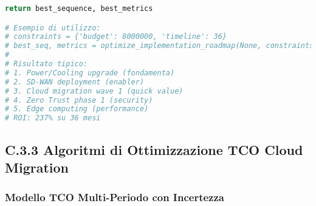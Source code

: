 \begin{lstlisting}[language=Python, caption=Algoritmo di Ottimizzazione Roadmap con Vincoli]
    return best_sequence, best_metrics

# Esempio di utilizzo:
# constraints = {'budget': 8000000, 'timeline': 36}
# best_seq, metrics = optimize_implementation_roadmap(None, constraints)
# 
# Risultato tipico:
# 1. Power/Cooling upgrade (fondamenta)
# 2. SD-WAN deployment (enabler)
# 3. Cloud migration wave 1 (quick value)
# 4. Zero Trust phase 1 (security)
# 5. Edge computing (performance)
# ROI: 237% su 36 mesi
\end{lstlisting}

\subsection{\texorpdfstring{\textbf{C.3.3 Algoritmi di Ottimizzazione TCO Cloud Migration}}{C.3.3 - Algoritmi di Ottimizzazione TCO Cloud Migration}}

\subsubsection{Modello TCO Multi-Periodo con Incertezza}

